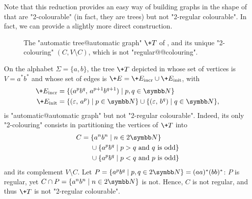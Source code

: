 Note that this reduction provides an easy way of building
graphs in the shape of  that are "2-colourable" (in fact, they are trees) but not "2-regular colourable". In fact, we can provide a slightly more
direct construction.

\begin{figure}
    \centering
    \begin{tikzpicture}
        
    \end{tikzpicture}
    \caption{
        \label{fig:tree-not-2reg-colour}
        The "automatic tree@automatic graph" $\+T$ of ,
        and its unique "2-colouring" $(C, V\setminus C)$, which is not "regular@@colouring".
    }
\end{figure}
\begin{example}
    \AP\label{ex:tree-not-2-reg-colourable}
    On the alphabet $\Sigma = \{a,b\}$, the tree $\+T$ depicted in  whose set of vertices is $V = a^*b^*$ and whose set 
    of edges is $\+E = \+E_{\mathrm{incr}} \cup \+E_{\mathrm{init}}$, with 
    \begin{align*}
        \+E_{\mathrm{incr}} & = \{(a^pb^q,\, a^{p+1}b^{q+1}) \mid p,q \in \N\} \\
        \+E_{\mathrm{init}} & = \{(\varepsilon,\, a^p) \mid p \in \N\} \cup \{(\varepsilon,\, b^q) \mid q \in \N\}, 
    \end{align*}    
    is "automatic@automatic graph" but not "2-regular colourable".
    Indeed, its only "2-colouring"
    consists in partitioning the vertices of $\+T$ into
    \begin{align*}
        C =\;& \{a^n b^n \mid n \in 2\N\} \\
            & \cup \{a^p b^q \mid p > q \text{ and $q$ is odd}\} \\
            & \cup \{a^p b^q \mid p < q \text{ and $p$ is odd}\}
    \end{align*}
    and its complement $V \setminus C$.
    Let $P = \{a^p b^q \mid p, q \in 2\N\} = (aa)^*(bb)^*$:
    $P$ is regular, yet $C \cap P = \{a^n b^n \mid n \in 2\N\}$ is not.
    Hence, $C$ is not regular, and thus $\+T$ is not "2-regular colourable".
\end{example}